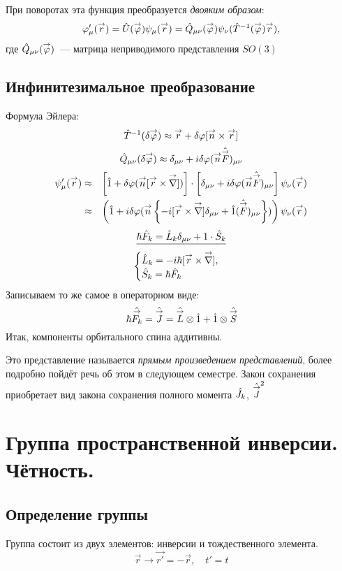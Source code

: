 При поворотах эта функция преобразуется \emph{двояким образом}:
$$
    \phi_{\mu}' (\vec r) = \Hat U(\vec \phi) \psi_\mu (\vec r) = \Hat Q_{\mu \nu} (\vec \phi) \psi_\nu (\Hat T^{-1} (\vec \phi) \vec r),
$$
где $\Hat Q_{\mu \nu} (\vec \phi)$~--- матрица неприводимого представления $SO(3)$
\subsection{Инфинитезимальное преобразование}
Формула Эйлера:
$$
    \Hat T^{-1} (\dta \vec \phi) \approx \vec r + \dta \phi[\vec n \times \vec r]
$$
$$
    \Hat Q_{\mu \nu} (\dta \vec \phi) \approx \dta_{\mu \nu} + i \dta \phi(\vec n \Hat{\vec F})_{\mu \nu}
$$
\begin{eqnarray*}
    \psi'_{\mu} (\vec r)& \approx& \left[\hat 1 + \dta \phi (\vec n [\vec r \times \vec \nla])\right] \cdot
    \left[ \dta_{\mu\nu} + i \dta \phi (\vec n \Hat{\vec F})_{\mu \nu} \right] \psi_{\nu} (\vec r)\\
    &\approx& \left(\hat 1 + i \dta \phi (\vec n 
    \left\{
        -i [\vec r \times \vec \nla] \dta _{\mu \nu} + \Hat 1 (\Hat{\vec F})_{\mu \nu}
    \right\})    
    \right) \psi_{\nu } (\vec r)
\end{eqnarray*}
$$
\underline{    \hbar \Hat F_k = \Hat L_k \dta_{\mu \nu} + 1 \cdot \hat S_k}
$$
$$
    \begin{cases}
        \Hat L_k = -i \hbar[\vec r \times \vec \nla],\\
        \Hat S_k = \hbar \Hat F_k
    \end{cases}
$$
Записываем то же самое в операторном виде:
$$
    \hbar \Hat{\vec{F_k}} = \Hat{\vec J} = \Hat{\vec L} \otimes \Hat 1 + \Hat 1 \otimes \Hat{\vec S}
$$
Итак, компоненты орбитального спина аддитивны.

Это представление называется \emph{прямым произведением представлений}, более подробно пойдёт речь об этом в следующем семестре. Закон сохранения приобретает вид закона сохранения полного момента $\Hat J_k$, $\Hat{\vec J}^2$

\section{Группа пространственной инверсии. Чётность.}
\subsection{Определение группы}
Группа состоит из двух элементов: инверсии и тождественного элемента.
$$
    \vec r \to \vec {r'} = - \vec r, \quad t' = t
$$

